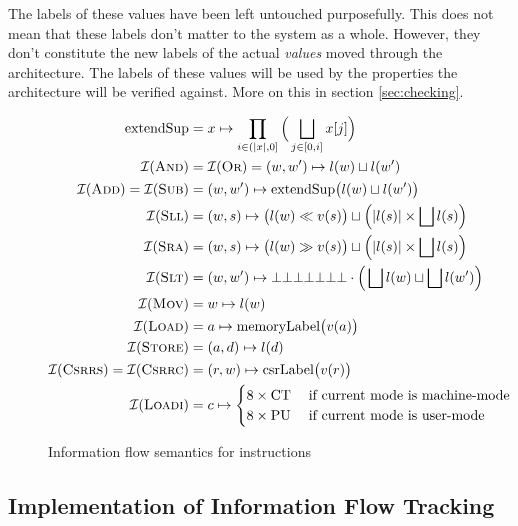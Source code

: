 The labels of these values have been left untouched purposefully.
This does not mean that these labels don't matter to the system as a whole.
However, they don't constitute the new labels of the actual \textit{values} moved through the architecture.
The labels of these values will be used by the properties the architecture will be verified against.
More on this in section \ref{sec:checking}.

\begin{figure}
    \begin{align*}
        \text{extendSup} &= x \mapsto \prod_{i \in (|x|, 0]} \Big( \bigsqcup_{j \in [0, i]} x[j] \Big) \\
        \mathcal{I}(\textsc{And}) &= \mathcal{I}(\textsc{Or}) = (w, w') \mapsto l(w) \sqcup l(w') \\
        \mathcal{I}(\textsc{Add}) = \mathcal{I}(\textsc{Sub}) &= (w, w') \mapsto \text{extendSup}\big(l(w) \sqcup l(w') \big) \\
        \mathcal{I}(\textsc{Sll}) &= (w, s) \mapsto \big(l(w) \ll v(s) \big) \sqcup \Big(|l(s)| \times \bigsqcup l(s) \Big) \\
        \mathcal{I}(\textsc{Sra}) &= (w, s) \mapsto \big(l(w) \gg v(s) \big) \sqcup \Big(|l(s)| \times \bigsqcup l(s) \Big) \\
        \mathcal{I}(\textsc{Slt}) &= (w, w') \mapsto \bot\bot\bot\bot\bot\bot\bot \cdot \Big(\bigsqcup l(w) \sqcup \bigsqcup l(w') \Big) \\
        \mathcal{I}(\textsc{Mov}) &= w \mapsto l(w) \\
        \mathcal{I}(\textsc{Load}) &= a \mapsto \text{memoryLabel}\big(v(a) \big) \\
        \mathcal{I}(\textsc{Store}) &= (a, d) \mapsto l(d) \\
        \mathcal{I}(\textsc{Csrrs}) = \mathcal{I}(\textsc{Csrrc}) &= (r, w) \mapsto \text{csrLabel}\big(v(r) \big) \\
        \mathcal{I}(\textsc{Loadi}) &= c \mapsto \begin{cases}
            8 \times \text{CT} & \; \text{if current mode is machine-mode} \\
            8 \times \text{PU} & \; \text{if current mode is user-mode}
        \end{cases}
    \end{align*}
    \caption{Information flow semantics for instructions}
    \label{fig:ifc-semantics}
\end{figure}

\subsection{Implementation of Information Flow Tracking}
\label{sec:ifc-implementation}

